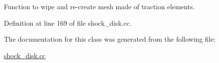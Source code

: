 Function to wipe and re-\/create mesh made of traction elements. 



Definition at line 169 of file shock\+\_\+disk.\+cc.



The documentation for this class was generated from the following file\+:\begin{DoxyCompactItemize}
\item 
\hyperlink{shock__disk_8cc}{shock\+\_\+disk.\+cc}\end{DoxyCompactItemize}

